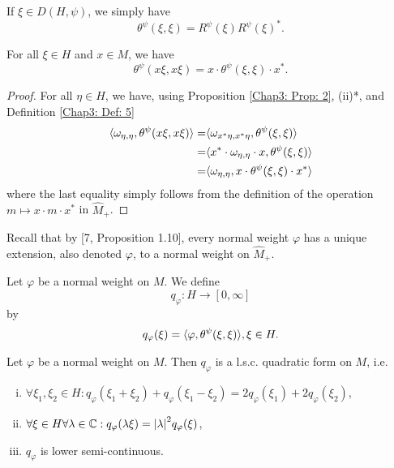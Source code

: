 \begin{remark}
    If $\xi\in D(H,\psi)$, we simply have
    \begin{equation}
        \theta^\psi(\xi,\xi)=R^\psi(\xi)R^\psi(\xi)^*.
    \end{equation}
\end{remark}
\begin{proposition}\label{Chap3: Prop: 7}
    For all $\xi\in H$ and $x\in M$, we have
    \[
        \theta^\psi(x\xi,x\xi)=x\cdot \theta^\psi(\xi,\xi)\cdot x^*.
    \]
\end{proposition}
\begin{proof}
    For all $\eta\in H$, we have, using Proposition \ref{Chap3: Prop: 2}, (ii)*, and Definition \ref{Chap3: Def: 5}
    \[
        \begin{split}
            \langle\omega_{\eta,\eta},\theta^\psi(x\xi,x\xi)\rangle=&\langle\omega_{x^*\eta,x^*\eta},\theta^\psi(\xi,\xi)\rangle\\
            =&\langle x^*\cdot\omega_{\eta,\eta}\cdot x,\theta^\psi(\xi,\xi)\rangle\\
            =&\langle\omega_{\eta,\eta},x\cdot\theta^\psi(\xi,\xi)\cdot x^*\rangle
        \end{split}
    \]
    where the last equality simply follows from the definition of the operation $m\mapsto x\cdot m\cdot x^*$ in $\widehat{M}_+$.
\end{proof}
Recall that by [7, Proposition 1.10], every normal weight $\varphi$ has a unique extension, also denoted $\varphi$, to a normal weight on $\widehat{M}_+$.
\begin{definition}
    Let $\varphi$ be a normal weight on $M$. We define
    \[
        q_\varphi: H\to [0,\infty]
    \]
    by
    \begin{equation}
        q_\varphi(\xi)=\langle\varphi,\theta^\psi(\xi,\xi)\rangle, \xi\in H.
    \end{equation}
\end{definition}
\begin{proposition}\label{Chap3: Prop: 9}
    Let $\varphi$ be a normal weight on $M$. Then $q_\varphi$ is a l.s.c. quadratic form on $M$, i.e.
    \begin{enumerate}[(i)]
        \item $\forall \xi_1,\xi_2\in H:q_\varphi(\xi_1+\xi_2)+q_\varphi(\xi_1-\xi_2)=2q_\varphi(\xi_1)+2q_\varphi(\xi_2)$,
        \item $\forall \xi\in H \forall \lambda\in \mathbb{C}: q_\varphi(\lambda \xi)=\abs{\lambda}^2q_\varphi(\xi)$,
        \item $q_\varphi$ is lower semi-continuous.
    \end{enumerate}
\end{proposition}

